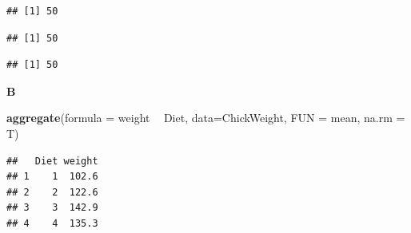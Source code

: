 \documentclass[]{book}
\newenvironment{Shaded}{\begin{snugshade}}{\end{snugshade}}
\newcommand{\CommentTok}[1]{\textcolor[rgb]{0.56,0.35,0.01}{\textit{#1}}}
\newcommand{\ControlFlowTok}[1]{\textcolor[rgb]{0.13,0.29,0.53}{\textbf{#1}}}
\newcommand{\DataTypeTok}[1]{\textcolor[rgb]{0.13,0.29,0.53}{#1}}
\newcommand{\KeywordTok}[1]{\textcolor[rgb]{0.13,0.29,0.53}{\textbf{#1}}}
\newcommand{\NormalTok}[1]{#1}
\newcommand{\OperatorTok}[1]{\textcolor[rgb]{0.81,0.36,0.00}{\textbf{#1}}}
\newcommand{\StringTok}[1]{\textcolor[rgb]{0.31,0.60,0.02}{#1}}
\begin{document}
\begin{verbatim}
## [1] 50
\end{verbatim}

\begin{Shaded}
\end{Shaded}

\begin{verbatim}
## [1] 50
\end{verbatim}

\begin{Shaded}
\end{Shaded}

\begin{verbatim}
## [1] 50
\end{verbatim}

\textbf{B}

\begin{Shaded}
\begin{Highlighting}[]
\KeywordTok{aggregate}\NormalTok{(}\DataTypeTok{formula =}\NormalTok{ weight }\OperatorTok{~}\StringTok{ }\NormalTok{Diet, }\DataTypeTok{data=}\NormalTok{ChickWeight, }\DataTypeTok{FUN =}\NormalTok{ mean, }\DataTypeTok{na.rm =}\NormalTok{ T)}
\end{Highlighting}
\end{Shaded}

\begin{verbatim}
##   Diet weight
## 1    1  102.6
## 2    2  122.6
## 3    3  142.9
## 4    4  135.3
\end{verbatim}

\begin{Shaded}
\end{Shaded}
\end{document}
